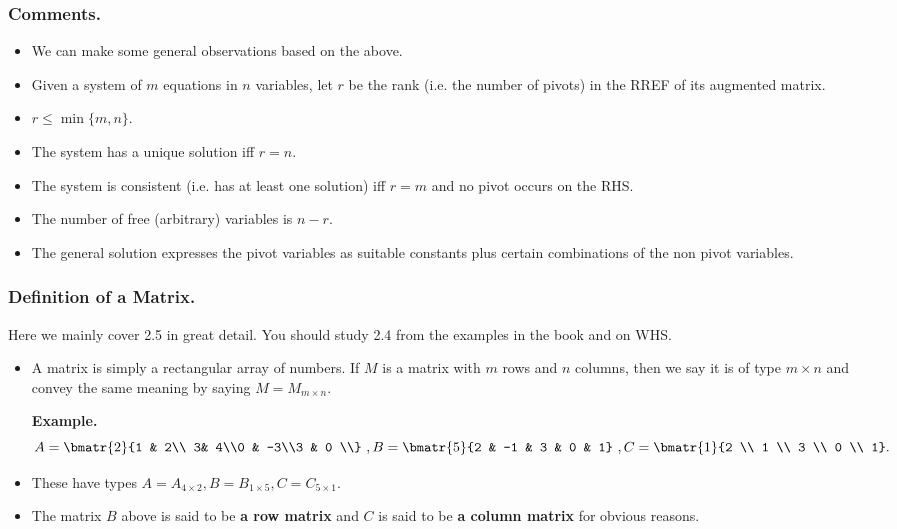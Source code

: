\begin{frame}%
  \frametitle{Comments.}
  \begin{itemize}%
 
\item We can make some general observations based on the above.

\item Given a system of $m$ equations in $n$ variables, let $r$ be the
rank (i.e. the number of pivots) in the RREF of its augmented matrix.

\item $r\leq \min\{m,n\}$.

\item The system has a unique solution iff $r=n$.

\item The system is consistent (i.e. has at least one solution) iff
$r=m$ and no pivot occurs on the RHS.

\item The number of free (arbitrary) variables is $n-r$.

\item The general solution expresses the pivot variables as suitable
constants plus certain combinations of the non pivot variables.
\end{itemize}
\end{frame}

\begin{frame} %

  \frametitle{Definition of a Matrix.}
 Here we mainly cover
 2.5 in great detail. You should study 2.4 from the examples in the book
 and on WHS.

  
  \begin{itemize}%

    \item A matrix is simply a rectangular array of numbers. If $M$ is a
    matrix with $m$ rows and $n$ columns, then we say it is of type
    $m\times n$ and convey the same meaning by saying $M=M_{m\times n}$.

    {\bf Example.}
    $$
    A=\bmatr{2}{1 & 2\\ 3& 4\\0 & -3\\3 & 0 \\}~,
    B=\bmatr{5}{2 & -1 & 3 & 0 & 1}~,
    C=\bmatr{1}{2 \\ 1 \\ 3 \\ 0 \\ 1}
    .$$
\item These have types $A=A_{4\times 2}, B=B_{1\times 5},C=C_{5\times 1}$.

 \item The matrix $B$ above is said to be {\bf a row matrix} and $C$ is said
 to be {\bf a column matrix} for obvious reasons.
 
  \end{itemize}
\end{frame}

